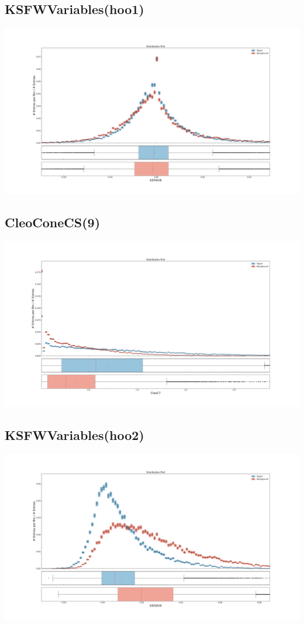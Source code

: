 \documentclass[10pt,a4paper]{article}
\begin{document}
\subsection{KSFWVariables(hoo1)}
\begin{center}
\includegraphics[width=1.0\textwidth]{variable_6766351307649934077.pdf}
\end{center}
\subsection{CleoConeCS(9)}
\begin{center}
\includegraphics[width=1.0\textwidth]{variable_7101278430072801043.pdf}
\end{center}
\subsection{KSFWVariables(hoo2)}
\begin{center}
\includegraphics[width=1.0\textwidth]{variable_470544404002129677.pdf}
\end{center}
\end{document}
